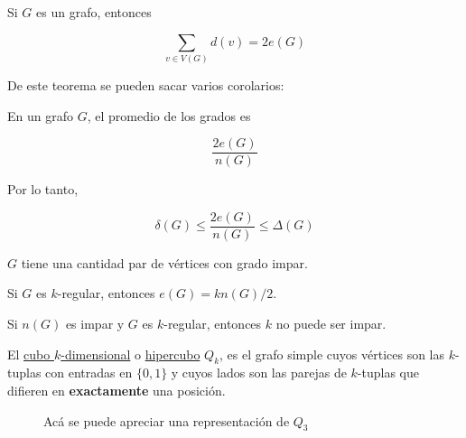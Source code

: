 \begin{teo}\label{teo:primer}
    Si $G$ es un grafo, entonces
    
    \[
    \sum_{v \in V(G)} d(v) = 2e(G)
    \]
\end{teo}

De este teorema se pueden sacar varios corolarios:

\begin{cor}
    En un grafo $G$, el promedio de los grados es
    
    \[
    \frac{2e(G)}{n(G)}
    \]
    
    Por lo tanto,
    
    \[
    \delta(G) \leq \frac{2e(G)}{n(G)} \leq \Delta(G)
    \]
\end{cor}

\begin{cor}
    $G$ tiene una cantidad par de vértices con grado impar.
\end{cor}

\begin{cor}
    Si $G$ es $k$-regular, entonces $e(G) = kn(G)/2$.
\end{cor}

\begin{cor}
    Si $n(G)$ es impar y $G$ es $k$-regular, entonces $k$ no puede ser impar.
\end{cor}

\begin{defn}
    El \ul{cubo $k$-dimensional} o \ul{hipercubo} $Q_k$, es el grafo simple cuyos vértices son las $k$-tuplas con entradas en $\{0,1\}$ y cuyos lados son las parejas de $k$-tuplas que difieren en \textbf{exactamente} una posición.
\end{defn}

\begin{figure}
    \centering
    \caption{Acá se puede apreciar una representación de $Q_3$}
    \label{fig:hipercubo}
\end{figure}

